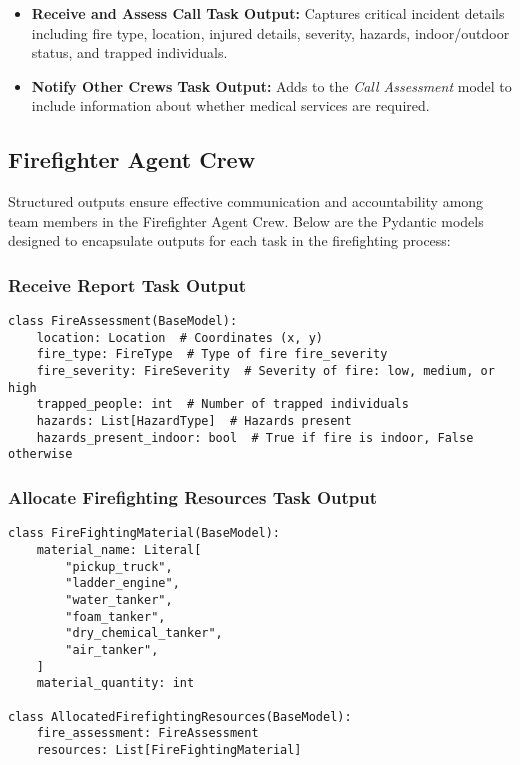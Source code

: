 \begin{itemize}
    \item \textbf{Receive and Assess Call Task Output:} Captures critical incident details including fire type, location, injured details, severity, hazards, indoor/outdoor status, and trapped individuals.
    \item \textbf{Notify Other Crews Task Output:} Adds to the \textit{Call Assessment} model to include information about 
    whether medical services are required.
\end{itemize}

\subsection{Firefighter Agent Crew}

Structured outputs ensure effective communication and accountability among team members in the Firefighter Agent Crew. Below are the Pydantic models designed to encapsulate outputs for each task in the firefighting process:

\subsubsection{Receive Report Task Output}
\begin{lstlisting}[caption={Pydantic model for Receive Report Task Output}]
class FireAssessment(BaseModel):
    location: Location  # Coordinates (x, y)
    fire_type: FireType  # Type of fire fire_severity
    fire_severity: FireSeverity  # Severity of fire: low, medium, or high
    trapped_people: int  # Number of trapped individuals
    hazards: List[HazardType]  # Hazards present
    hazards_present_indoor: bool  # True if fire is indoor, False otherwise
\end{lstlisting}


\subsubsection{Allocate Firefighting Resources Task Output}
\begin{lstlisting}[caption={Pydantic model for Allocate Firefighting Resources Task Output}]
class FireFightingMaterial(BaseModel):
    material_name: Literal[
        "pickup_truck",
        "ladder_engine",
        "water_tanker",
        "foam_tanker",
        "dry_chemical_tanker",
        "air_tanker",
    ]
    material_quantity: int

class AllocatedFirefightingResources(BaseModel):
    fire_assessment: FireAssessment
    resources: List[FireFightingMaterial]
\end{lstlisting}


